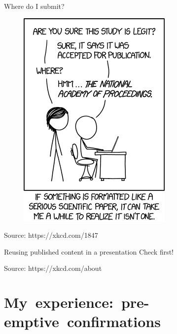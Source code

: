 \documentclass[10pt]{beamer}
\begin{document}
\begin{frame}{Where do I submit?}
	\begin{figure}
		\includegraphics[trim={0pt 60pt 0pt 0pt}, clip, width=0.5\columnwidth]{images/xkcdjournal}
	\end{figure}
    \hfill \tiny{Source: https://xkcd.com/1847}
\end{frame}

\begin{frame}{Reusing published content in a presentation}
	\alert{Check first!}
	\begin{figure}
	\end{figure}
    \hfill \tiny{Source: https://xkcd.com/about}
\end{frame}

\section{\mbox{My experience: pre-emptive confirmations}}
\end{document}
